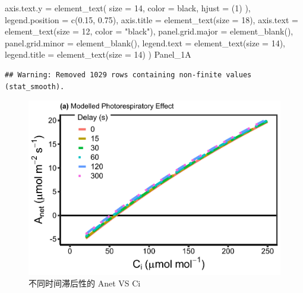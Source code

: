 \documentclass[
]{krantz}
\makeatletter
\newenvironment{Shaded}{\begin{snugshade}}{\end{snugshade}}
\newcommand{\AttributeTok}[1]{\textcolor[rgb]{0.77,0.63,0.00}{#1}}
\newcommand{\DecValTok}[1]{\textcolor[rgb]{0.00,0.00,0.81}{#1}}
\newcommand{\FloatTok}[1]{\textcolor[rgb]{0.00,0.00,0.81}{#1}}
\newcommand{\FunctionTok}[1]{\textcolor[rgb]{0.00,0.00,0.00}{#1}}
\newcommand{\NormalTok}[1]{#1}
\newcommand{\StringTok}[1]{\textcolor[rgb]{0.31,0.60,0.02}{#1}}
\newenvironment{kframe}{%
\medskip{}
\setlength{\fboxsep}{.8em}
 \def\at@end@of@kframe{}%
 \ifinner\ifhmode%
  \def\at@end@of@kframe{\end{minipage}}%
  \begin{minipage}{\columnwidth}%
 \fi\fi%
 \def\FrameCommand##1{\hskip\@totalleftmargin \hskip-\fboxsep
 \colorbox{shadecolor}{##1}\hskip-\fboxsep
     \hskip-\linewidth \hskip-\@totalleftmargin \hskip\columnwidth}%
 \MakeFramed {\advance\hsize-\width
   \@totalleftmargin\z@ \linewidth\hsize
   \@setminipage}}%
 {\par\unskip\endMakeFramed%
 \at@end@of@kframe}
\renewenvironment{Shaded}{\begin{kframe}}{\end{kframe}}
\makeatother
\begin{document}
\begin{Shaded}
\begin{Highlighting}[]
    \AttributeTok{axis.text.y =}
      \FunctionTok{element\_text}\NormalTok{(}
        \AttributeTok{size =} \DecValTok{14}\NormalTok{,}
        \AttributeTok{color =} \StringTok{\textquotesingle{}black\textquotesingle{}}\NormalTok{,}
        \AttributeTok{hjust =}\NormalTok{ (}\DecValTok{1}\NormalTok{)}
\NormalTok{      ),}
    \AttributeTok{legend.position =} \FunctionTok{c}\NormalTok{(}\FloatTok{0.15}\NormalTok{, }\FloatTok{0.75}\NormalTok{),}
    \AttributeTok{axis.title =} \FunctionTok{element\_text}\NormalTok{(}\AttributeTok{size =} \DecValTok{18}\NormalTok{),}
    \AttributeTok{axis.text =} \FunctionTok{element\_text}\NormalTok{(}\AttributeTok{size =} \DecValTok{12}\NormalTok{, }\AttributeTok{color =} \StringTok{"black"}\NormalTok{),}
    \AttributeTok{panel.grid.major =} \FunctionTok{element\_blank}\NormalTok{(),}
    \AttributeTok{panel.grid.minor =} \FunctionTok{element\_blank}\NormalTok{(),}
    \AttributeTok{legend.text =} \FunctionTok{element\_text}\NormalTok{(}\AttributeTok{size =} \DecValTok{14}\NormalTok{),}
    \AttributeTok{legend.title =} \FunctionTok{element\_text}\NormalTok{(}\AttributeTok{size =} \DecValTok{14}\NormalTok{)}
\NormalTok{  )}
\NormalTok{Panel\_1A}
\end{Highlighting}
\end{Shaded}

\begin{verbatim}
## Warning: Removed 1029 rows containing non-finite values (stat_smooth).
\end{verbatim}

\begin{figure}
\centering
\includegraphics{bookdown_files/figure-latex/prdataplot-1.pdf}
\caption{\label{fig:prdataplot}不同时间滞后性的 Anet VS Ci}
\end{figure}
\end{document}
